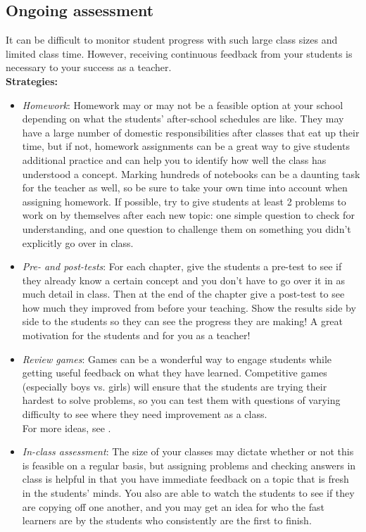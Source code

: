 \subsection{Ongoing assessment}
It can be difficult to monitor student progress with such large class sizes and limited class time. However, receiving continuous feedback from your students is necessary to your success as a teacher.\\

\textbf{Strategies:}
\begin{itemize}
\item\emph{Homework}: Homework may or may not be a feasible option at your school depending on what the students' after-school schedules are like. They may have a large number of domestic responsibilities after classes that eat up their time, but if not, homework assignments can be a great way to give students additional practice and can help you to identify how well the class has understood a concept. Marking hundreds of notebooks can be a daunting task for the teacher as well, so be sure to take your own time into account when assigning homework. If possible, try to give students at least 2 problems to work on by themselves after each new topic: one simple question to check for understanding, and one question to challenge them on something you didn't explicitly go over in class.

\item\emph{Pre- and post-tests}: For each chapter, give the students a pre-test to see if they already know a certain concept and you don't have to go over it in as much detail in class. Then at the end of the chapter give a post-test to see how much they improved from before your teaching. Show the results side by side to the students so they can see the progress they are making! A great motivation for the students and for you as a teacher!

\item\emph{Review games}: Games can be a wonderful way to engage students while getting useful feedback on what they have learned. Competitive games (especially boys vs. girls) will ensure that the students are trying their hardest to solve problems, so you can test them with questions of varying difficulty to see where they need improvement as a class.\\
For more ideas, see .

\item\emph{In-class assessment}: The size of your classes may dictate whether or not this is feasible on a regular basis, but assigning problems and checking answers in class is helpful in that you have immediate feedback on a topic that is fresh in the students' minds. You also are able to watch the students to see if they are copying off one another, and you may get an idea for who the fast learners are by the students who consistently are the first to finish.


\end{itemize}
